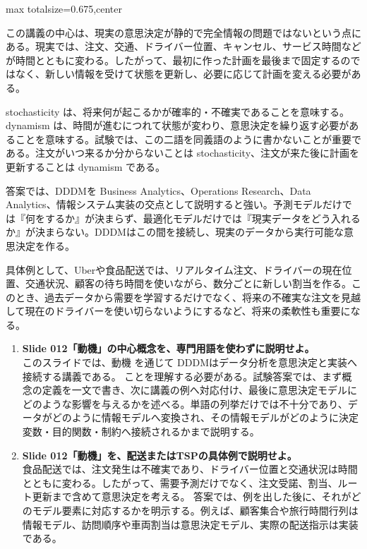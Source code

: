\begin{adjustbox}{max totalsize={\textwidth}{0.675\textheight},center}
\begin{minipage}{\textwidth}
\begin{minipage}[t]{0.485\textwidth}
この講義の中心は、現実の意思決定が静的で完全情報の問題ではないという点にある。現実では、注文、交通、ドライバー位置、キャンセル、サービス時間などが時間とともに変わる。したがって、最初に作った計画を最後まで固定するのではなく、新しい情報を受けて状態を更新し、必要に応じて計画を変える必要がある。\par
stochasticity は、将来何が起こるかが確率的・不確実であることを意味する。dynamism は、時間が進むにつれて状態が変わり、意思決定を繰り返す必要があることを意味する。試験では、この二語を同義語のように書かないことが重要である。注文がいつ来るか分からないことは stochasticity、注文が来た後に計画を更新することは dynamism である。\par
答案では、DDDMを Business Analytics、Operations Research、Data Analytics、情報システム実装の交点として説明すると強い。予測モデルだけでは『何をするか』が決まらず、最適化モデルだけでは『現実データをどう入れるか』が決まらない。DDDMはこの間を接続し、現実のデータから実行可能な意思決定を作る。\par
具体例として、Uberや食品配送では、リアルタイム注文、ドライバーの現在位置、交通状況、顧客の待ち時間を使いながら、数分ごとに新しい割当を作る。このとき、過去データから需要を学習するだけでなく、将来の不確実な注文を見越して現在のドライバーを使い切らないようにするなど、将来の柔軟性も重要になる。\par
{}
\begin{enumerate}
\item \textbf{Slide 012「動機」の中心概念を、専門用語を使わずに説明せよ。}\\このスライドでは、動機 を通じて DDDMはデータ分析を意思決定と実装へ接続する講義である。 ことを理解する必要がある。試験答案では、まず概念の定義を一文で書き、次に講義の例へ対応付け、最後に意思決定モデルにどのような影響を与えるかを述べる。単語の列挙だけでは不十分であり、データがどのように情報モデルへ変換され、その情報モデルがどのように決定変数・目的関数・制約へ接続されるかまで説明する。
\item \textbf{Slide 012「動機」を、配送またはTSPの具体例で説明せよ。}\\食品配送では、注文発生は不確実であり、ドライバー位置と交通状況は時間とともに変わる。したがって、需要予測だけでなく、注文受諾、割当、ルート更新まで含めて意思決定を考える。 答案では、例を出した後に、それがどのモデル要素に対応するかを明示する。例えば、顧客集合や旅行時間行列は情報モデル、訪問順序や車両割当は意思決定モデル、実際の配送指示は実装である。
\end{enumerate}
\end{minipage}
\end{minipage}
\end{adjustbox}

